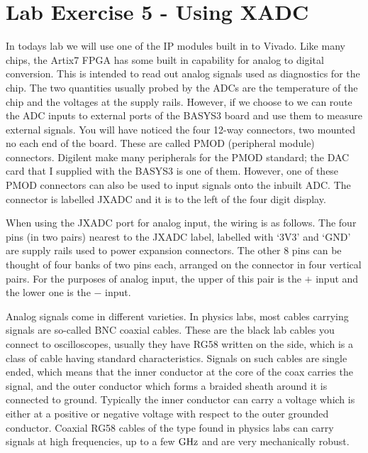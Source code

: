 \documentclass[../physical_computing.tex]{subfiles}
\begin{document}
\chapter{Lab Exercise 5 - Using XADC}
\label{sec:appendix_6}

In todays lab we will use one of the IP modules built in to Vivado. Like many chips, the Artix7 FPGA has 
some built in capability for analog to digital conversion. This is intended to read out analog signals used
as diagnostics for the chip. The two quantities usually probed by the ADCs are the temperature of the chip
and the voltages at the supply rails. However, if we choose to we can route the ADC inputs to external ports
of the BASYS3 board and use them to measure external signals. You will have noticed the four 12-way connectors, 
two mounted no each end of the board. These are called PMOD (peripheral module) connectors. Digilent make many
peripherals for the PMOD standard; the DAC card that I supplied with the BASYS3 is one of them. However, one 
of these PMOD connectors can also be used to input signals onto the inbuilt ADC. The connector is labelled
JXADC and it is to the left of the four digit display. 

When using the JXADC port for analog input, the wiring is as follows. The four pins (in two pairs) nearest
to the JXADC label, labelled with `3V3' and `GND' are supply rails used to power expansion connectors. The 
other 8 pins can be thought of four banks of two pins each, arranged on the connector in four vertical pairs.
For the purposes of analog input, the upper of this pair is the $+$ input and the lower one is the $-$ input.

Analog signals come in different varieties. In physics labs, most cables carrying signals are so-called BNC
coaxial cables. These are the black lab cables you connect to oscilloscopes, usually they have RG58 written on
the side, which is a class of cable having standard characteristics. 
Signals on such cables are single ended, which means that the inner conductor at the core of the
coax carries the signal, and the outer conductor which forms a braided sheath around it is connected to ground.
Typically the inner conductor can carry a voltage which is either at a positive or negative voltage with respect
to the outer grounded conductor. Coaxial RG58 cables of the type found in physics labs can carry signals at high
frequencies, up to a few $\rm GHz$ and are very mechanically robust.
\end{document}
